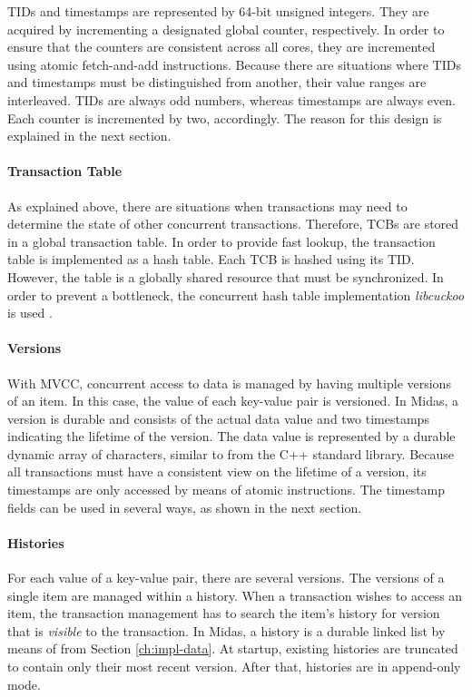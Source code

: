 TIDs and timestamps are represented by 64-bit unsigned integers. They are acquired by incrementing a designated global counter, respectively. In order to ensure that the counters are consistent across all cores, they are incremented using atomic fetch-and-add instructions. Because there are situations where TIDs and timestamps must be distinguished from another, their value ranges are interleaved. TIDs are always odd numbers, whereas timestamps are always even. Each counter is incremented by two, accordingly. The reason for this design is explained in the next section.

\paragraph{Transaction Table}

As explained above, there are situations when transactions may need to determine the state of other concurrent transactions. Therefore, TCBs are stored in a global transaction table. In order to provide fast lookup, the transaction table is implemented as a hash table. Each TCB is hashed using its TID. However, the table is a globally shared resource that must be synchronized. In order to prevent a bottleneck, the concurrent hash table implementation \emph{libcuckoo} is used \cite{fan2013memc3, li2014algorithmic, libcuckoo2018home}.

\paragraph{Versions}

With MVCC, concurrent access to data is managed by having multiple versions of an item. In this case, the value of each key-value pair is versioned. In Midas, a version is durable and consists of the actual data value and two timestamps indicating the lifetime of the version. The data value is represented by a durable dynamic array of characters, similar to  from the C++ standard library. Because all transactions must have a consistent view on the lifetime of a version, its timestamps are only accessed by means of atomic instructions. The timestamp fields can be used in several ways, as shown in the next section.

\paragraph{Histories}

For each value of a key-value pair, there are several versions. The versions of a single item are managed within a history. When a transaction wishes to access an item, the transaction management has to search the item's history for version that is \emph{visible} to the transaction. In Midas, a history is a durable linked list by means of  from Section \ref{ch:impl-data}. At startup, existing histories are truncated to contain only their most recent version. After that, histories are in append-only mode.

